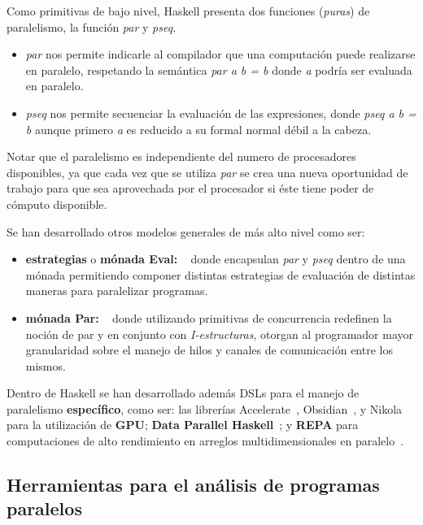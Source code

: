 Como primitivas de bajo nivel, Haskell presenta dos funciones (\textit{puras}) de paralelismo,
la funci\'on \textit{par} y \textit{pseq}.
\begin{itemize}
  \item \textit{par} nos permite indicarle al compilador que una computaci\'on
puede realizarse en paralelo, respetando la sem\'antica \textit{par a b = b} donde
\textit{a} podr\'ia ser evaluada en paralelo.
  \item \textit{pseq} nos permite secuenciar la evaluaci\'on de
las expresiones, donde \textit{pseq a b = b} aunque primero \textit{a} es reducido
a su formal normal d\'ebil a la cabeza.
\end{itemize}
%
%
Notar que el paralelismo es independiente del numero de procesadores disponibles, ya que
cada vez que se utiliza \textit{par} se crea una nueva oportunidad de trabajo para que sea
aprovechada por el procesador si \'este tiene poder de c\'omputo disponible.

Se han desarrollado otros modelos generales de m\'as alto nivel como ser:
\begin{itemize}
\item \textbf{estrategias} o \textbf{m\'onada Eval:} ~\parencite{strategies-2010}
  donde encapsulan \textit{par} y \textit{pseq} dentro de una m\'onada
  permitiendo componer distintas estrategias de evaluaci\'on de distintas maneras
  para paralelizar programas.
\item \textbf{m\'onada Par:}  ~\parencite{Marlow:2011:MDP:2096148.2034685} donde utilizando
  primitivas de concurrencia redefinen la noci\'on de par y en conjunto con \textit{I-estructuras},
  otorgan al programador mayor granularidad sobre el manejo de hilos y canales
  de comunicaci\'on entre los mismos.
\end{itemize}


Dentro de Haskell se han desarrollado adem\'as DSLs para el manejo de
paralelismo \textbf{espec\'ifico}, como ser: las librer\'ias
Accelerate~\parencite{Accelerate}, Obsidian~\parencite{Obsidian}, y
Nikola~\parencite{mainland2010} para la utilizaci\'on de
\textbf{GPU}; \textbf{Data Parallel Haskell}~\parencite{DPH}; y
\textbf{REPA} para computaciones de alto rendimiento en arreglos
multidimensionales en paralelo~\parencite{REPA}.

\subsection{Herramientas para el an\'alisis de programas paralelos}

